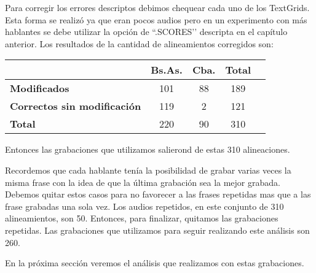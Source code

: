 Para corregir los errores descriptos debimos chequear cada uno de los TextGrids. Esta forma se realizó ya que eran pocos audios pero en un experimento con más hablantes se debe utilizar la opción de ``.SCORES’’ descripta en el capítulo anterior. Los resultados de la cantidad de alineamientos corregidos son:

\begin{table}[h]
\centering
\begin{tabular}{|l|c|c|c|c|}
\hline
\textbf{}  & \textbf{Bs.As. } & \textbf{Cba.} & \textbf{Total} \\ \hline
\textbf{Modificados}  & 101 & 88 & 189 \\ \hline
\textbf{Correctos sin modificación}  & 119 & 2 & 121 \\ \hline
\textbf{Total} & 220 & 90 & 310 \\ \hline
\end{tabular}
\end{table}

Entonces las grabaciones que utilizamos salierond de estas 310 alineaciones. 

Recordemos que cada hablante tenía la posibilidad de grabar varias veces la misma frase con la idea de que la última grabación sea la mejor grabada. Debemos quitar estos casos para no favorecer a las frases repetidas mas que a las frase grabadas una sola vez. Los audios repetidos, en este conjunto de 310 alineamientos, son 50. Entonces, para finalizar, quitamos las grabaciones repetidas. Las grabaciones que utilizamos para seguir realizando este análisis son 260. 

En la próxima sección veremos el análisis que realizamos con estas grabaciones. 